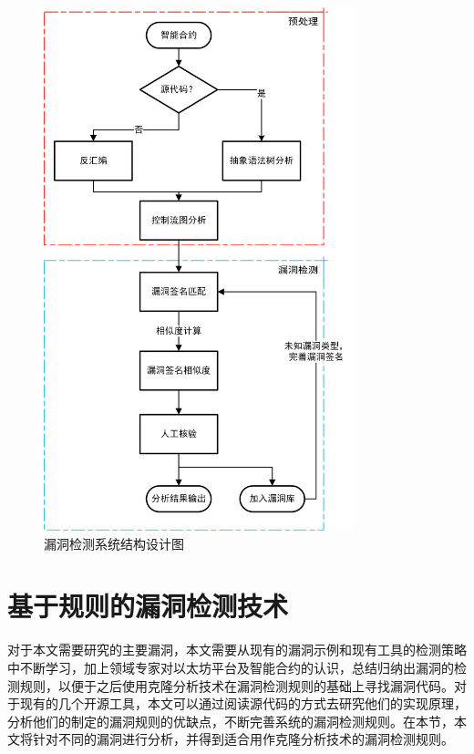\begin{figure}[htb]
\vspace{+2mm}
  \centering
  \includegraphics[width=0.8\textwidth]{figures/system_diagram.png}
  \caption{漏洞检测系统结构设计图}
  \label{fig:system_diagram}
\vspace{-5mm}
\end{figure}

\section{基于规则的漏洞检测技术}\label{sec:detection_rules}

对于本文需要研究的主要漏洞，本文需要从现有的漏洞示例和现有工具的检测策略中不断学习，加上领域专家对以太坊平台及智能合约的认识，总结归纳出漏洞的检测规则，以便于之后使用克隆分析技术在漏洞检测规则的基础上寻找漏洞代码。对于现有的几个开源工具，本文可以通过阅读源代码的方式去研究他们的实现原理，分析他们的制定的漏洞规则的优缺点，不断完善系统的漏洞检测规则。在本节，本文将针对不同的漏洞进行分析，并得到适合用作克隆分析技术的漏洞检测规则。

